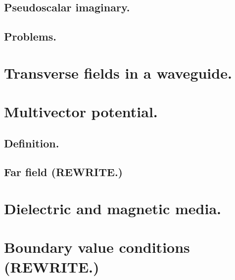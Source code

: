          \subsection{Pseudoscalar imaginary.}
            
         \subsection{Problems.}
            
      \section{Transverse fields in a waveguide.}
         
      \section{Multivector potential.}
         \subsection{Definition.}
         
         \subsection{Far field (REWRITE.)}
            
      \section{Dielectric and magnetic media.}
         
      \section{Boundary value conditions (REWRITE.)}
         
